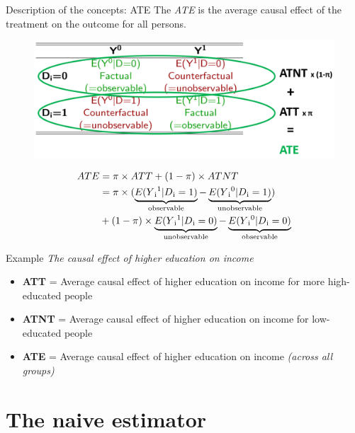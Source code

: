 \documentclass{beamer}\usepackage[]{graphicx}\usepackage[]{xcolor}
\begin{document}
\begin{frame}{Description of the concepts: ATE}
The \textit{ATE} is the average causal effect of the treatment on the outcome for all persons.
\begin{figure}
\centering
\includegraphics[width=1\textwidth]{Graphics/ATE.png}
\end{figure}
\begin{align*}
ATE &= \pi \times ATT + (1-\pi) \times ATNT \\
&= \pi \times (\underbrace{E(Y\textsubscript{i}\textsuperscript{1} \vert D\textsubscript{i}=1)}_\text{observable} - \underbrace{E(Y\textsubscript{i}\textsuperscript{0} \vert D\textsubscript{i}=1)}_\text{unobservable}) \\
&+ (1-\pi) \times \underbrace{E(Y\textsubscript{i}\textsuperscript{1} \vert D\textsubscript{i}=0)}_\text{unobservable} - \underbrace{E(Y\textsubscript{i}\textsuperscript{0} \vert D\textsubscript{i}=0)}_\text{observable}
\end{align*}
\end{frame}



\begin{frame}{Example}
\textit{The causal effect of higher education on income} \\[2em]
  \begin{itemize}
    \item \textbf{ATT} = Average causal effect of higher education on income for more high-educated people
    \item \textbf{ATNT} = Average causal effect of higher education on income for low-educated people
   \item \textbf{ATE} = Average causal effect of higher education on income \textit{(across all groups)}
  \end{itemize}
\end{frame}


\section{The naive estimator} %
\end{document}
